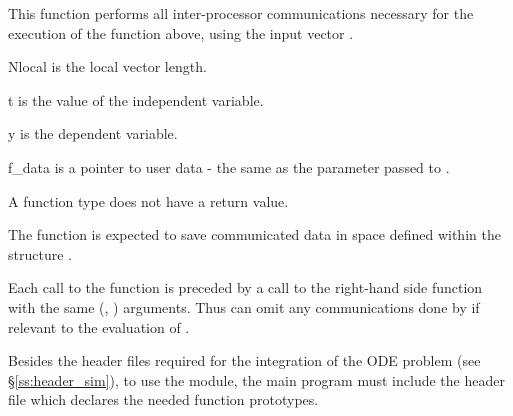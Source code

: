 {
  This function performs all inter-processor communications necessary 
  for the execution of the  function above, using the input vector .
}
{
  \begin{args}[Nlocal]
  \item[Nlocal] 
    is the local vector length.
  \item[t]
    is the value of the independent variable.
  \item[y]
    is the dependent variable. 
  \item[f\_data]
    is a pointer to user data - the same as the       
    parameter passed to .  
  \end{args}
}
{
  A  function type does not have a return value.
}
{
  The  function is expected to save communicated data in space defined within the
  structure . 

  Each call to the  function is preceded by a call to the right-hand side
  function  with the same (, ) arguments.  Thus  can omit 
  any communications done by  if relevant to the evaluation of .  
}


Besides the header files required for the integration of the ODE problem
(see \S\ref{ss:header_sim}),  to use the {\cvbbdpre} module, the main program 
must include the header file  which declares the needed
function prototypes.

